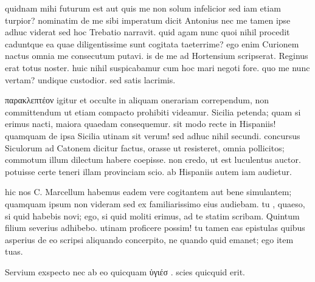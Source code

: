 


 quidnam mihi futurum est aut quis me non solum infelicior sed iam etiam turpior? nominatim de me sibi imperatum dicit Antonius nec me tamen ipse adhuc viderat sed hoc Trebatio narravit. quid agam nunc quoi nihil procedit caduntque ea quae diligentissime sunt cogitata taeterrime? ego enim Curionem nactus omnia me consecutum putavi. is de me ad Hortensium scripserat. Reginus erat totus noster. huic nihil suspicabamur cum hoc mari negoti fore. quo me nunc vertam? undique custodior. sed satis lacrimis.

 παρακλεπτέον igitur et occulte in aliquam onerariam corrependum, non committendum ut etiam compacto prohibiti videamur. Sicilia petenda; quam si erimus nacti, maiora quaedam consequemur. sit modo recte in Hispaniis! quamquam de ipsa Sicilia utinam sit verum! sed adhuc nihil secundi. concursus Siculorum ad Catonem dicitur factus, orasse ut resisteret, omnia pollicitos; commotum illum dilectum habere coepisse. non credo, ut est luculentus auctor. potuisse certe teneri illam provinciam scio. ab Hispaniis autem iam audietur.

 hic nos C. Marcellum habemus eadem vere cogitantem aut bene simulantem; quamquam ipsum non videram sed ex familiarissimo eius audiebam. tu , quaeso, si quid habebis novi; ego, si quid moliti erimus, ad te statim scribam. Quintum filium severius adhibebo. utinam proficere possim! tu tamen eas epistulas quibus asperius de eo scripsi aliquando concerpito, ne quando quid emanet; ego item tuas.

 Servium exspecto nec ab eo quicquam ὑγιέσ . scies quicquid erit.
